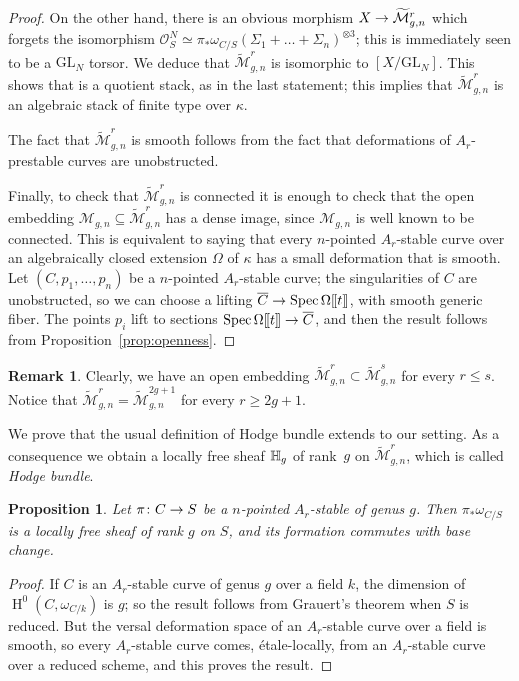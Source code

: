\documentclass{alggeom}
\numberwithin{equation}{section}
\numberwithin{subsection}{section}
\newtheorem{proposition}[theorem]{Proposition}
\theoremstyle{definition}
\newtheorem{remark}[theorem]{Remark}
\theoremstyle{remark}
\newcommand\cM{\mathcal{M}} \newcommand\cN{\mathcal{N}}
\newcommand\cO{\mathcal{O}} \newcommand\cP{\mathcal{P}}
\newcommand\arr{\ifinner\to\else\longrightarrow\fi}
\renewcommand\H{\operatorname{H}}
\newcommand\spec{\operatorname{Spec}}
\newcommand{\GL}{\mathrm{GL}}
\newcommand{\ds}[1]{[\mspace{-2mu}[#1]\mspace{-2mu}]}
\newcommand{\Mtilde}{\widetilde{\mathcal M}}
\newcommand{\mt}{\widetilde{\mathcal M}}
\begin{document}
\begin{proof}
	On the other hand, there is an obvious morphism $X \arr \mt_{g,n}^r$ which forgets the isomorphism $\cO_{S}^{N} \simeq \pi_{*}\omega_{C/S}(\Sigma_{1}+ \dots + \Sigma_{n})^{\otimes 3}$; this is immediately seen to be a $\GL_{N}$ torsor. We deduce that $\mt_{g,n}^r$ is isomorphic to $[X/\GL_{N}]$. This shows that is a quotient stack, as in the last statement; this implies that $\mt_{g,n}^r$ is an algebraic stack of finite type over $\kappa$.
	
	The fact that $\mt_{g,n}^r$ is smooth follows from the fact that deformations of $A_{r}$-prestable curves are unobstructed.
	
	Finally, to check that $\mt_{g,n}^r$ is connected it is enough to check that the open embedding $\cM_{g,n} \subseteq \mt_{g,n}^r$ has a dense image, since $\cM_{g,n}$ is well known to be connected. This is equivalent to saying that every $n$-pointed $A_r$-stable curve over an algebraically closed extension $\Omega$ of $\kappa$ has a small deformation that is smooth. Let $(C, p_{1}, \dots, p_{n})$ be a $n$-pointed $A_r$-stable curve; the singularities of $C$ are unobstructed, so we can choose a lifting $\overline{C}\arr \spec \Omega\ds{t}$, with smooth generic fiber. The points $p_{i}$ lift to sections $\spec\Omega\ds{t} \arr \overline{C}$, and then the result follows from  Proposition~\ref{prop:openness}.
	
\end{proof}
\begin{remark}\label{rem: max-sing}
	Clearly, we have an open embedding $\Mtilde_{g,n}^r  \subset \Mtilde_{g,n}^s$ for every $r\leq s$. Notice that $\Mtilde_{g,n}^r=\Mtilde_{g,n}^{2g+1}$ for every $r\geq 2g+1$. 
\end{remark}

We prove that the usual definition of Hodge bundle extends to our setting.  As a consequence we obtain a locally free sheaf $\mathbb{H}_{g}$ of rank~$g$ on $\mt_{g, n}^r$, which is called \emph{Hodge bundle}.

\begin{proposition}\label{prop:hodge-bundle}
	Let $\pi\colon C \arr S$ be a $n$-pointed $A_r$-stable of genus $g$. Then $\pi_{*}{\omega}_{C/S}$ is a locally free sheaf of rank $g$ on $S$, and its formation commutes with base change.
\end{proposition}
\begin{proof}
	If $C$ is an $A_r$-stable curve of genus $g$ over a field $k$, the dimension of $\H^{0}(C, \omega_{C/k})$ is $g$; so the result follows from Grauert's theorem when $S$ is reduced. But the versal deformation space of an $A_{r}$-stable curve over a field is smooth, so every $A_{r}$-stable curve comes, \'{e}tale-locally, from an $A_{r}$-stable curve over a reduced scheme, and this proves the result.
\end{proof}
\end{document}
